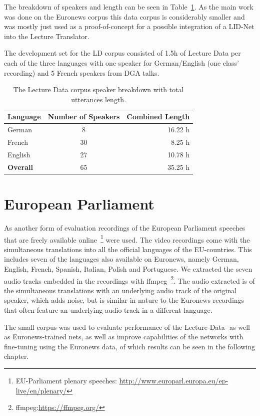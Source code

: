 The breakdown of speakers and length can be seen in Table~\ref{tab:spkDataLD}. As the main work was done on the Euronews corpus this data corpus is considerably smaller and was mostly just used as a proof-of-concept for a possible integration of a LID-Net into the Lecture Translator. 

The development set for the LD corpus consisted of 1.5h of Lecture Data per each of the three languages with one speaker for German/English (one class' recording) and 5 French speakers from DGA talks.
\begin{table}[h!]
\caption{The Lecture Data corpus speaker breakdown with total utterances length.}
\label{tab:spkDataLD}
\centering
\begin{tabular}{| l | c | r | }
	\hline
	\textbf{Language} & \textbf{Number of Speakers} & \textbf{Combined Length} \\
	\hline
	German & 8 &  16.22 h \\
	French & 30 & 8.25 h \\  
	English & 27 & 10.78 h \\ 
	\hline
	\textbf{Overall} & 65 & 35.25 h\\
	\hline	
\end{tabular}
\end{table}

\section{European Parliament}
\label{sec:LITasks:EU}

As another form of evaluation recordings of the European Parliament speeches that are freely available online~\footnote{EU-Parliament plenary speeches: \url{http://www.europarl.europa.eu/ep-live/en/plenary/}} were used. The video recordings come with the simultaneous translations into all the official languages of the EU-countries.  This includes seven of the languages also available on Euronews, namely German, English, French, Spanish, Italian, Polish and Portuguese. We extracted the seven audio tracks embedded in the recordings with ffmpeg~\footnote{ffmpeg:\url{https://ffmpeg.org/}}. The audio extracted is of the simultaneous translations with an underlying audio track of the original speaker, which adds noise, but is similar in nature to the Euronews recordings that often feature an underlying audio track in a different language.

The small corpus was used to evaluate performance of the Lecture-Data- as well as Euronews-trained nets, as well as improve capabilities of the networks with fine-tuning using the Euronews data, of which results can be seen in the following chapter.


